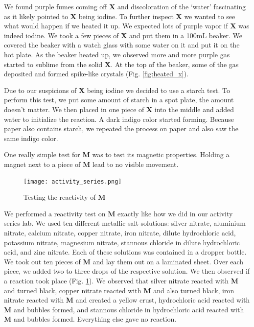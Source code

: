 \documentclass[titlepage]{article}
\begin{document}
We found purple fumes coming off \textbf{X} and discoloration of the `water' fascinating as it likely pointed to \textbf{X} being iodine. To further inspect \textbf{X} we wanted to see what would happen if we heated it up. We expected lots of purple vapor if \textbf{X} was indeed iodine. We took a few pieces of \textbf{X} and put them in a 100\unit{\milli\liter} beaker. We covered the beaker with a watch glass with some water on it and put it on the hot plate. As the beaker heated up, we observed more and more purple gas started to sublime from the solid \textbf{X}. At the top of the beaker, some of the gas deposited and formed spike-like crystals (Fig. \ref{fig:heated_x}).

\bigskip
Due to our suspicions of \textbf{X} being iodine we decided to use a starch test. To perform this test, we put some amount of starch in a spot plate, the amount doesn't matter. We then placed in one piece of \textbf{X} into the middle and added water to initialize the reaction. A dark indigo color started forming. Because paper also contains starch, we repeated the process on paper and also saw the same indigo color.

\bigskip
One really simple test for \textbf{M} was to test its magnetic properties. Holding a magnet next to a piece of \textbf{M} lead to no visible movement.

\begin{figure}[h]
    \centering
    \texttt{[image: activity\_series.png]} 
    \caption{Testing the reactivity of \textbf{M}}
    \label{fig:act_series}
\end{figure}

We performed a reactivity test on \textbf{M} exactly like how we did in our activity series lab. We used ten different metallic salt solutions: silver nitrate, aluminium nitrate, calcium nitrate, copper nitrate, iron nitrate, dilute hydrochloric acid, potassium nitrate, magnesium nitrate, stannous chloride in dilute hydrochloric acid, and zinc nitrate. Each of these solutions was contained in a dropper bottle. We took out ten pieces of \textbf{M} and lay them out on a laminated sheet. Over each piece, we added two to three drops of the respective solution. We then observed if a reaction took place (Fig. \ref{fig:act_series}). We observed that silver nitrate reacted with \textbf{M} and turned black, copper nitrate reacted with \textbf{M} and also turned black, iron nitrate reacted with \textbf{M} and created a yellow crust, hydrochloric acid reacted with \textbf{M} and bubbles formed, and stannous chloride in hydrochloric acid reacted with \textbf{M} and bubbles formed. Everything else gave no reaction.
\end{document}
